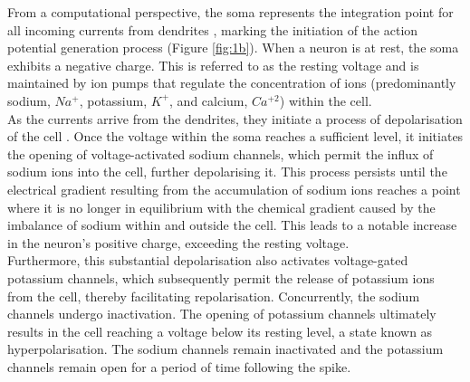 \noindent From a computational perspective, the soma represents the integration point for all incoming currents from dendrites \cite{polsky2004computational}, marking the initiation of the action potential generation process (Figure \ref{fig:1b}). When a neuron is at rest, the soma exhibits a negative charge. This is referred to as the resting voltage and is maintained by ion pumps that regulate the concentration of ions (predominantly sodium, $Na^+$, potassium, $K^+$, and calcium, $Ca^{+2}$) within the cell. \\


\noindent As the currents arrive from the dendrites, they initiate a process of depolarisation of the cell \cite{johnston1996active}. Once the voltage within the soma reaches a sufficient level, it initiates the opening of voltage-activated sodium channels, which permit the influx of sodium ions into the cell, further depolarising it. This process persists until the electrical gradient resulting from the accumulation of sodium ions reaches a point where it is no longer in equilibrium with the chemical gradient caused by the imbalance of sodium within and outside the cell. This leads to a notable increase in the neuron's positive charge, exceeding the resting voltage. \\

\noindent Furthermore, this substantial depolarisation also activates voltage-gated potassium channels, which subsequently permit the release of potassium ions from the cell, thereby facilitating repolarisation. Concurrently, the sodium channels undergo inactivation. The opening of potassium channels ultimately results in the cell reaching a voltage below its resting level, a state known as hyperpolarisation. The sodium channels remain inactivated and the potassium channels remain open for a period of time following the spike. \\

